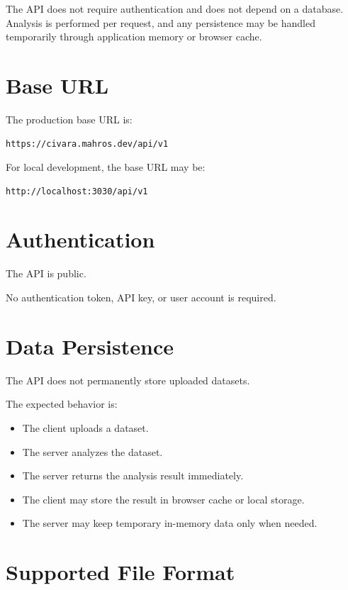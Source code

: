 \documentclass[12pt,a4paper]{article}
\begin{document}
The API does not require authentication and does not depend on a database. Analysis is performed per request, and any persistence may be handled temporarily through application memory or browser cache.

\section{Base URL}

The production base URL is:

\begin{lstlisting}
https://civara.mahros.dev/api/v1
\end{lstlisting}

For local development, the base URL may be:

\begin{lstlisting}
http://localhost:3030/api/v1
\end{lstlisting}

\section{Authentication}

The API is public.

No authentication token, API key, or user account is required.

\section{Data Persistence}

The API does not permanently store uploaded datasets.

The expected behavior is:

\begin{itemize}
    \item The client uploads a dataset.
    \item The server analyzes the dataset.
    \item The server returns the analysis result immediately.
    \item The client may store the result in browser cache or local storage.
    \item The server may keep temporary in-memory data only when needed.
\end{itemize}

\section{Supported File Format}
\end{document}

